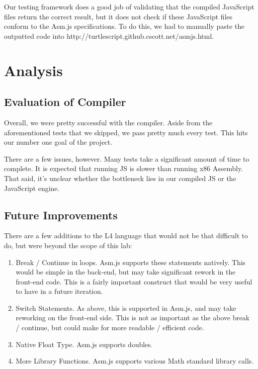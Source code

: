 \documentclass[twoside]{article}
\begin{document}
\begin{multicols}{2}
Our testing framework does a good job of validating that the compiled JavaScript
files return the correct result, but it does not check if these JavaScript files
conform to the Asm.js specifications. To do this, we had to manually paste the
outputted code into http://turtlescript.github.cscott.net/asmjs.html.


\section{Analysis}

\subsection{Evaluation of Compiler}

Overall, we were pretty successful with the compiler. Aside from the aforementioned
tests that we skipped, we pass pretty much every test. This hits our number one
goal of the project.

There are a few issues, however. Many tests take a significant amount of time to
complete. It is expected that running JS is slower than running x86 Assembly.
That said, it's unclear whether the bottleneck lies in our compiled JS or the
JavaScript engine.

\subsection{Future Improvements}

There are a few additions to the L4 language that would not be that difficult
to do, but were beyond the scope of this lab:

\begin{enumerate}
  \item Break / Continue in loops. Asm.js supports these statements natively.
    This would be simple in the back-end, but may take significant rework in the
    front-end code. This is a fairly important construct that would be very useful
    to have in a future iteration.
  \item Switch Statements. As above, this is supported in Asm.js, and may take
    reworking on the front-end side. This is not as important as the above break
    / continue, but could make for more readable / efficient code.
  \item Native Float Type. Asm.js supports doubles.
  \item More Library Functions. Asm.js supports various Math standard library
    calls.
\end{enumerate}


\end{multicols}
\end{document}
